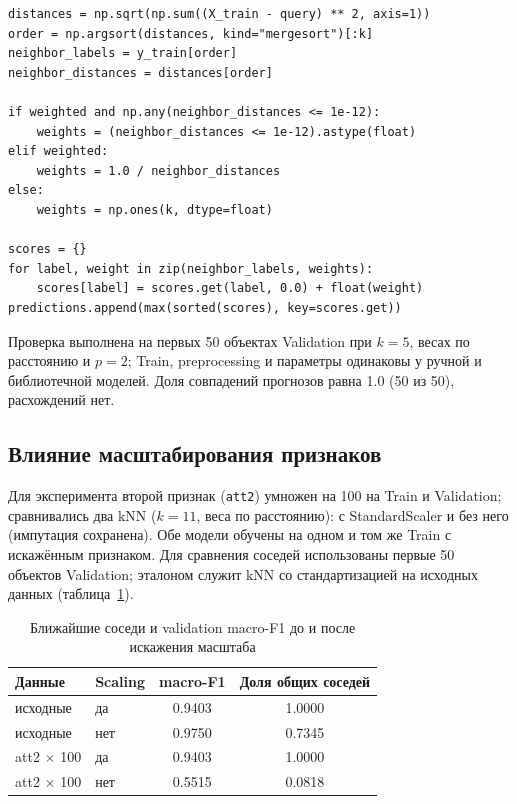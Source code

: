 \documentclass[14pt,a4paper]{extarticle}
\begin{document}
\begin{lstlisting}[caption={Ядро ручной реализации kNN},label={lst:knn}]
distances = np.sqrt(np.sum((X_train - query) ** 2, axis=1))
order = np.argsort(distances, kind="mergesort")[:k]
neighbor_labels = y_train[order]
neighbor_distances = distances[order]

if weighted and np.any(neighbor_distances <= 1e-12):
    weights = (neighbor_distances <= 1e-12).astype(float)
elif weighted:
    weights = 1.0 / neighbor_distances
else:
    weights = np.ones(k, dtype=float)

scores = {}
for label, weight in zip(neighbor_labels, weights):
    scores[label] = scores.get(label, 0.0) + float(weight)
predictions.append(max(sorted(scores), key=scores.get))
\end{lstlisting}

Проверка выполнена на первых 50 объектах Validation при $k=5$, весах по расстоянию и $p=2$; Train, preprocessing и параметры одинаковы у ручной и библиотечной моделей. Доля совпадений прогнозов равна 1.0 (50 из 50), расхождений нет.

\subsection{Влияние масштабирования признаков}

Для эксперимента второй признак (\texttt{att2}) умножен на 100 на Train и Validation; сравнивались два kNN ($k=11$, веса по расстоянию): с StandardScaler и без него (импутация сохранена). Обе модели обучены на одном и том же Train с искажённым признаком. Для сравнения соседей использованы первые 50 объектов Validation; эталоном служит kNN со стандартизацией на исходных данных (таблица~\ref{tab:scaling}).

\begin{table}[h!]
\centering
\begin{tabular}{llcc}
\toprule
Данные & Scaling & macro-F1 & Доля общих соседей \\
\midrule
исходные  & да  & 0.9403 & 1.0000 \\
исходные  & нет & 0.9750 & 0.7345 \\
att2 $\times$ 100 & да  & 0.9403 & 1.0000 \\
att2 $\times$ 100 & нет & 0.5515 & 0.0818 \\
\bottomrule
\end{tabular}
\caption{Ближайшие соседи и validation macro-F1 до и после искажения масштаба}
\label{tab:scaling}
\end{table}
\end{document}
